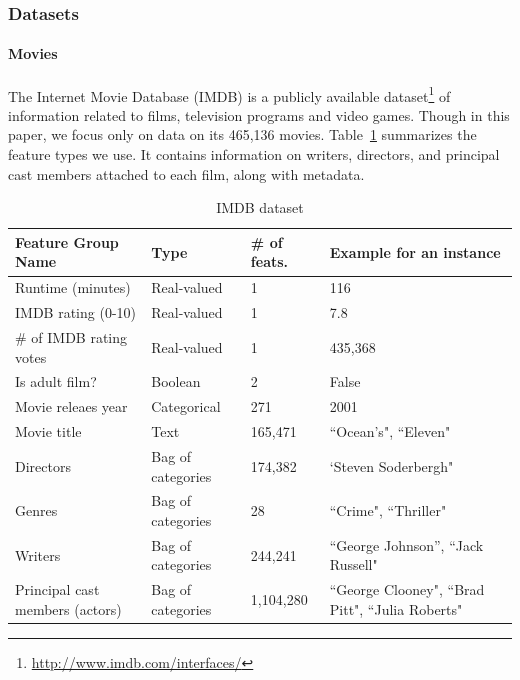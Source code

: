 \documentclass{article} %
\begin{document}
\subsubsection{Datasets}

\paragraph{Movies}
The Internet Movie Database (IMDB) is a publicly available dataset\footnote{\href{http://www.imdb.com/interfaces/}{http://www.imdb.com/interfaces/}} of information related to films, television programs and video games.
Though in this paper, we focus only on data on its 465,136 movies.
Table~\ref{tab:features} summarizes the feature types we use.
It contains information on writers, directors, and principal cast members attached to each film, along with  metadata.

\begin{table}[htb]
\footnotesize
\centering
\caption{IMDB dataset}
\label{tab:features}
\begin{tabular}{@{}lllp{6cm}@{}}
\toprule
Feature Group Name      & Type              & \# of feats. & Example for an instance                                      \\ \midrule
Runtime (minutes)       & Real-valued       & 1                 & 116                                                           \\
IMDB rating (0-10)      & Real-valued       & 1                 & 7.8                                                          \\
\# of IMDB rating votes & Real-valued       & 1                 & 435,368                                                          \\ 
Is adult film?          & Boolean           & 2                 & False                                                        \\
Movie releaes year      & Categorical          & 271               & 2001                                                         \\
Movie title             & Text      & 165,471           & ``Ocean's", ``Eleven"                                  \\
Directors               & Bag of categories & 174,382           & `Steven Soderbergh"                                     \\
Genres                  & Bag of categories & 28                &``Crime", ``Thriller"                                 \\
Writers                 & Bag of categories & 244,241           &``George Johnson'', ``Jack Russell"                      \\
Principal cast members (actors) & Bag of categories & 1,104,280         & ``George Clooney", ``Brad Pitt", ``Julia Roberts" \\\bottomrule
\end{tabular}
\end{table}
\end{document}
